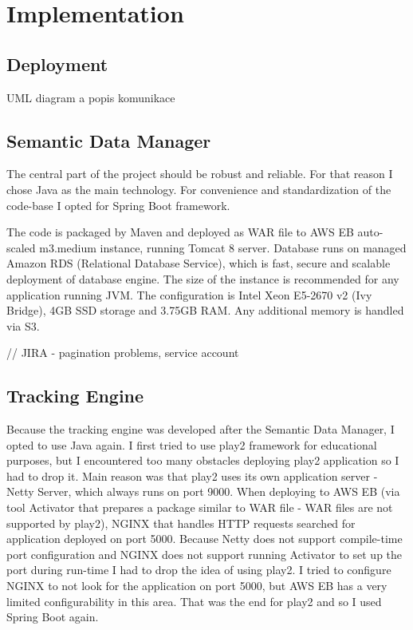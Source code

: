 \chapter{Implementation}

\section{Deployment}
UML diagram a popis komunikace

\section{Semantic Data Manager}
The central part of the project should be robust and reliable. For that reason I chose Java as the main technology. For convenience and standardization of the code-base I opted for Spring Boot framework.

The code is packaged by Maven and deployed as WAR file to AWS EB auto-scaled m3.medium instance, running Tomcat 8 server. Database runs on managed Amazon RDS (Relational Database Service), which is fast, secure and scalable deployment of database engine. The size of the instance is recommended for any application running JVM. The configuration is Intel Xeon E5-2670 v2 (Ivy Bridge), 4GB SSD storage and 3.75GB RAM. Any additional memory is handled via S3.

// JIRA - pagination problems, service account

\section{Tracking Engine}

Because the tracking engine was developed after the Semantic Data Manager, I opted to use Java again. I first tried to use play2 framework for educational purposes, but I encountered too many obstacles deploying play2 application so I had to drop it. Main reason was that play2 uses its own application server - Netty Server, which always runs on port 9000. When deploying to AWS EB (via tool Activator that prepares a package similar to WAR file - WAR files are not supported by play2), NGINX that handles HTTP requests searched for application deployed on port 5000. Because Netty does not support compile-time port configuration and NGINX does not support running Activator to set up the port during run-time I had to drop the idea of using play2. I tried to configure NGINX to not look for the application on port 5000, but AWS EB has a very limited configurability in this area. That was the end for play2 and so I used Spring Boot again.

